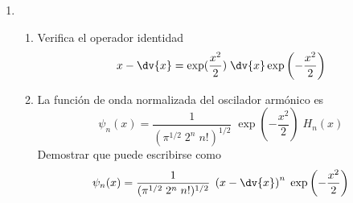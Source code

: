 \begin{enumerate}
\item \begin{enumerate}[label=\alph{*})]
\item Verifica el operador identidad
\[ x - \dv{x} = \exp(\dfrac{x^{2}}{2}) \; \dv{x} \exp \left(- \dfrac{x^{2}}{2} \right) \]
\item La función de onda normalizada del oscilador armónico es
\[ \psi_{n} (x) = \dfrac{1}{(\pi^{1/2} \; 2^{n} \; n!)^{1/2}} \; \exp \left(- \dfrac{x^{2}}{2} \right) \; H_{n}(x) \]
Demostrar que puede escribirse como
\[ \psi_{n} (x) = \dfrac{1}{(\pi^{1/2} \; 2^{n} \; n!)^{1/2}} \; \left( x - \dv{x} \right)^{n} \; \exp \left(- \dfrac{x^{2}}{2} \right) \]

\end{enumerate}
\end{enumerate}
